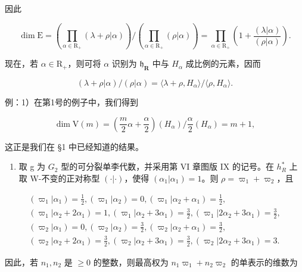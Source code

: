 因此

\[
\dim \mathrm{E} = \left(\prod_ {\alpha \in \mathrm{R} _ {+}} (\lambda + \rho | \alpha)\right) / \left(\prod_ {\alpha \in \mathrm{R} _ {+}} (\rho | \alpha)\right) = \prod_ {\alpha \in \mathrm{R} _ {+}} \left(1 + \frac {(\lambda | \alpha)}{(\rho | \alpha)}\right).
\]

现在，若 \(\alpha \in \mathrm{R}_{+}\)，则可将 \(\alpha\) 识别为 \(\mathfrak{h}_{\mathbf{R}}\) 中与 \(H_{\alpha}\) 成比例的元素，因而

\[
(\lambda + \rho | \alpha) / (\rho | \alpha) = \langle \lambda + \rho , H _ {\alpha} \rangle / \langle \rho , H _ {\alpha} \rangle .
\]

例：1）在第1号的例子中，我们得到

\[
\dim \mathrm{V} (m) = \left(\frac {m}{2} \alpha + \frac {\alpha}{2}\right) (H _ {\alpha}) / \frac {\alpha}{2} (H _ {\alpha}) = m + 1,
\]

这正是我们在 §1 中已经知道的结果。

\begin{enumerate}
\def\labelenumi{\arabic{enumi})}
\setcounter{enumi}{1}
\tightlist
\item
  取 g 为 \(G_{2}\) 型的可分裂单李代数，并采用第 VI 章图版 IX 的记号。在 \(h_{R}^{*}\) 上取 W-不变的正对称型 \((\cdot|\cdot)\)，使得 \((\alpha_{1}|\alpha_{1})=1\)。则 \(\rho=\varpi_{1}+\varpi_{2}\)，且
\end{enumerate}

\[
\begin{array}{c} (\varpi_ {1} | \alpha_ {1}) = \frac {1}{2}, (\varpi_ {1} | \alpha_ {2}) = 0, (\varpi_ {1} | \alpha_ {2} + \alpha_ {1}) = \frac {1}{2}, \\ (\varpi_ {1} | \alpha_ {2} + 2 \alpha_ {1}) = 1, (\varpi_ {1} | \alpha_ {2} + 3 \alpha_ {1}) = \frac {3}{2}, (\varpi_ {1} | 2 \alpha_ {2} + 3 \alpha_ {1}) = \frac {3}{2}, \\ (\varpi_ {2} | \alpha_ {1}) = 0, (\varpi_ {2} | \alpha_ {2}) = \frac {3}{2}, (\varpi_ {2} | \alpha_ {2} + \alpha_ {1}) = \frac {3}{2}, \\ (\varpi_ {2} | \alpha_ {2} + 2 \alpha_ {1}) = \frac {3}{2}, (\varpi_ {2} | \alpha_ {2} + 3 \alpha_ {1}) = \frac {3}{2}, (\varpi_ {2} | 2 \alpha_ {2} + 3 \alpha_ {1}) = 3. \end{array}
\]

因此，若 \(n_1, n_2\) 是 \(\geq 0\) 的整数，则最高权为 \(n_1\varpi_1 + n_2\varpi_2\) 的单表示的维数为

